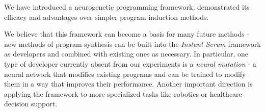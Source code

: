 We have introduced a neurogenetic programming framework, demonstrated its efficacy and advantages over simpler program induction methods.

We believe that this framework can become a basis for many future methods - new methods of program synthesis can be built into the \emph{Instant Scrum} framework as developers and combined with existing ones as necessary.
In particular, one type of developer currently absent from our experiments is a \emph{neural mutation} - a neural network that modifies existing programs and can be trained to modify them in a way that improves their performance.
Another important direction is applying the framework to more specialized tasks like robotics or healthcare decision support. 